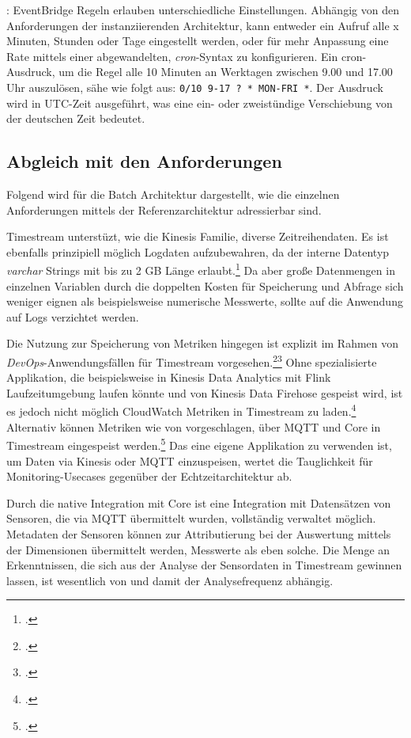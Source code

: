 : EventBridge Regeln erlauben unterschiedliche Einstellungen. Abhängig von den Anforderungen der instanziierenden Architektur, kann entweder ein Aufruf alle x Minuten, Stunden oder Tage eingestellt werden, oder für mehr Anpassung eine Rate mittels einer abgewandelten, \textit{cron}-Syntax zu konfigurieren. Ein cron-Ausdruck, um die Regel alle 10 Minuten an Werktagen zwischen 9.00 und 17.00 Uhr auszulösen, sähe wie folgt aus: \texttt{0/10 9-17 ? * MON-FRI *}. Der Ausdruck wird in \ac{UTC}-Zeit ausgeführt, was eine ein- oder zweistündige Verschiebung von der deutschen Zeit bedeutet.


\subsection{Abgleich mit den Anforderungen}\label{subsection:Anforderunge-B}
Folgend wird für die Batch Architektur dargestellt, wie die einzelnen Anforderungen mittels der Referenzarchitektur adressierbar sind.

Timestream unterstüzt, wie die Kinesis Familie, diverse Zeitreihendaten. Es ist ebenfalls prinzipiell möglich Logdaten aufzubewahren, da der interne Datentyp \textit{varchar} Strings mit bis zu 2 GB Länge erlaubt.\footcite[Vgl.][]{AmazonWebServicesInc..o.J.r} Da aber große Datenmengen in einzelnen Variablen durch die doppelten Kosten für Speicherung und Abfrage sich weniger eignen als beispielsweise numerische Messwerte, sollte auf die Anwendung auf Logs verzichtet werden.

Die Nutzung zur Speicherung von Metriken hingegen ist explizit im Rahmen von \textit{DevOps}-Anwendungsfällen für Timestream vorgesehen.\footcite[Vgl.][]{AmazonWebServicesInc..o.J.ak}\nzitat\footcite[Vgl.][]{Das.2020} Ohne spezialisierte Applikation, die beispielsweise in Kinesis Data Analytics mit Flink Laufzeitumgebung laufen könnte und von Kinesis Data Firehose gespeist wird, ist es jedoch nicht möglich CloudWatch Metriken in Timestream zu laden.\footcite[Vgl.][]{Riddle.2021} Alternativ können Metriken wie von \citeauthor{Pochiraju.2020} vorgeschlagen, über \ac{MQTT} und \AWSIOT{} Core in Timestream eingespeist werden.\footcite[Vgl.][]{Pochiraju.2020} Das eine eigene Applikation zu verwenden ist, um Daten via Kinesis oder \ac{MQTT} einzuspeisen, wertet die Tauglichkeit für Monitoring-Usecases gegenüber der Echtzeitarchitektur ab.


Durch die native Integration mit \AWSIOT{} Core ist eine Integration mit Datensätzen von Sensoren, die via \ac{MQTT} übermittelt wurden, vollständig verwaltet möglich. Metadaten der Sensoren können zur Attributierung bei der Auswertung mittels der Dimensionen übermittelt werden, Messwerte als eben solche. Die Menge an Erkenntnissen, die sich aus der Analyse der Sensordaten in Timestream gewinnen lassen, ist wesentlich von  und damit der Analysefrequenz abhängig.

